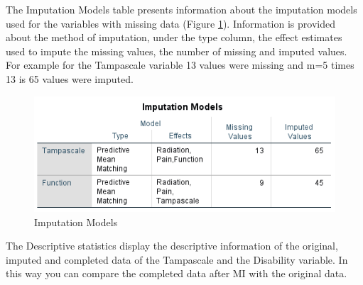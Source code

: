 \documentclass[]{book}
\begin{document}
The Imputation Models table presents information about the imputation
models used for the variables with missing data (Figure
\ref{fig:tab4-6}). Information is provided about the method of
imputation, under the type column, the effect estimates used to impute
the missing values, the number of missing and imputed values. For
example for the Tampascale variable 13 values were missing and m=5 times
13 is 65 values were imputed.

\begin{figure}

{\centering \includegraphics[width=0.9\linewidth]{images/tab4.6} 

}

\caption{Imputation Models}\label{fig:tab4-6}
\end{figure}

The Descriptive statistics display the descriptive information of the
original, imputed and completed data of the Tampascale and the
Disability variable. In this way you can compare the completed data
after MI with the original data.
\end{document}
